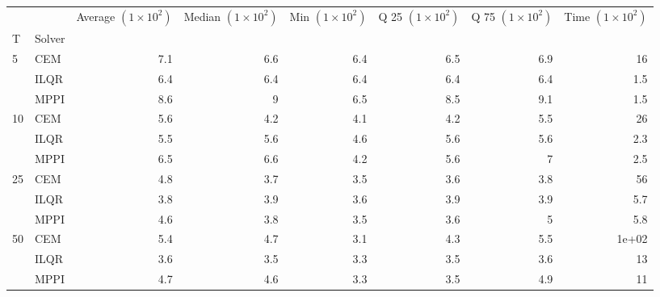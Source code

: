 \documentclass[]{standalone}
\begin{document}
\begin{tabular}{llrrrrrr}
\toprule
   &      &  Average $(1 \times 10^2) $ &  Median $(1 \times 10^2) $ &  Min $(1 \times 10^2) $ &  Q 25 $(1 \times 10^2) $ &  Q 75 $(1 \times 10^2) $ &  Time $(1 \times 10^2) $ \\
T & Solver &                             &                            &                         &                          &                          &                          \\
\midrule
5  & CEM &                         7.1 &                        6.6 &                     6.4 &                      6.5 &                      6.9 &                       16 \\
   & ILQR &                         6.4 &                        6.4 &                     6.4 &                      6.4 &                      6.4 &                      1.5 \\
   & MPPI &                         8.6 &                          9 &                     6.5 &                      8.5 &                      9.1 &                      1.5 \\
10 & CEM &                         5.6 &                        4.2 &                     4.1 &                      4.2 &                      5.5 &                       26 \\
   & ILQR &                         5.5 &                        5.6 &                     4.6 &                      5.6 &                      5.6 &                      2.3 \\
   & MPPI &                         6.5 &                        6.6 &                     4.2 &                      5.6 &                        7 &                      2.5 \\
25 & CEM &                         4.8 &                        3.7 &                     3.5 &                      3.6 &                      3.8 &                       56 \\
   & ILQR &                         3.8 &                        3.9 &                     3.6 &                      3.9 &                      3.9 &                      5.7 \\
   & MPPI &                         4.6 &                        3.8 &                     3.5 &                      3.6 &                        5 &                      5.8 \\
50 & CEM &                         5.4 &                        4.7 &                     3.1 &                      4.3 &                      5.5 &                    1e+02 \\
   & ILQR &                         3.6 &                        3.5 &                     3.3 &                      3.5 &                      3.6 &                       13 \\
   & MPPI &                         4.7 &                        4.6 &                     3.3 &                      3.5 &                      4.9 &                       11 \\
\bottomrule
\end{tabular}
\end{document}
